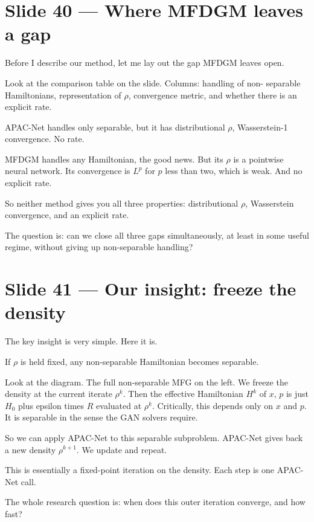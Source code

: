 \documentclass[11pt]{article}
\begin{document}
\section*{Slide 40 --- Where MFDGM leaves a gap}

Before I describe our method, let me lay out the gap MFDGM leaves open.

Look at the comparison table on the slide. Columns: handling of non-
separable Hamiltonians, representation of $\rho$, convergence metric, and
whether there is an explicit rate.

APAC-Net handles only separable, but it has distributional $\rho$,
Wasserstein-1 convergence. No rate.

MFDGM handles any Hamiltonian, the good news. But its $\rho$ is a pointwise
neural network. Its convergence is $L^p$ for $p$ less than two, which is
weak. And no explicit rate.

So neither method gives you all three properties: distributional $\rho$,
Wasserstein convergence, and an explicit rate.

The question is: can we close all three gaps simultaneously, at least in
some useful regime, without giving up non-separable handling?

\section*{Slide 41 --- Our insight: freeze the density}

The key insight is very simple. Here it is.

If $\rho$ is held fixed, any non-separable Hamiltonian becomes separable.

Look at the diagram. The full non-separable MFG on the left. We freeze the
density at the current iterate $\rho^k$. Then the effective Hamiltonian
$H^k$ of $x$, $p$ is just $H_0$ plus epsilon times $R$ evaluated at $\rho^k$.
Critically, this depends only on $x$ and $p$. It is separable in the sense
the GAN solvers require.

So we can apply APAC-Net to this separable subproblem. APAC-Net gives back
a new density $\rho^{k+1}$. We update and repeat.

This is essentially a fixed-point iteration on the density. Each step is one
APAC-Net call.

The whole research question is: when does this outer iteration converge,
and how fast?

\end{document}
